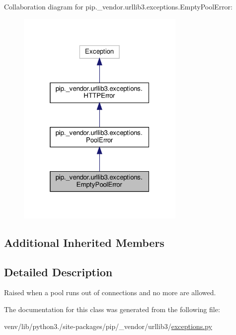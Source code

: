 Collaboration diagram for pip.\+\_\+vendor.\+urllib3.\+exceptions.\+Empty\+Pool\+Error\+:
\nopagebreak
\begin{figure}[H]
\begin{center}
\leavevmode
\includegraphics[width=229pt]{classpip_1_1__vendor_1_1urllib3_1_1exceptions_1_1EmptyPoolError__coll__graph}
\end{center}
\end{figure}
\subsection*{Additional Inherited Members}


\subsection{Detailed Description}
\begin{DoxyVerb}Raised when a pool runs out of connections and no more are allowed.\end{DoxyVerb}
 

The documentation for this class was generated from the following file\+:\begin{DoxyCompactItemize}
\item 
venv/lib/python3./site-\/packages/pip/\+\_\+vendor/urllib3/\hyperlink{pip_2__vendor_2urllib3_2exceptions_8py}{exceptions.\+py}\end{DoxyCompactItemize}

